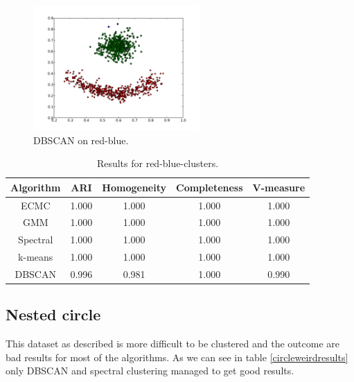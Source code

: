\documentclass[conference]{IEEEtran}
\begin{document}
\begin{figure}[th]
\centering
\includegraphics[width=15pc]{dbscan_red-blue-clusters.pdf}
\caption{DBSCAN on red-blue.}
\label{DBSCAN_redblue}
\end{figure}

\begin{table}[htbp]
\caption{Results for red-blue-clusters.}
\label{redblueresults}
\begin{center}
\setlength{\tabcolsep}{3pt}
\begin{tabular}{ |c|c|c|c|c| }
\hline
	\bf Algorithm & \bf ARI & \bf Homogeneity & \bf Completeness & \bf V-measure\\ \hline
	
	ECMC & 1.000 & 1.000 & 1.000 & 1.000 \\ \hline
	GMM & 1.000 & 1.000 & 1.000 & 1.000 \\ \hline
	Spectral & 1.000 & 1.000 & 1.000 & 1.000 \\ \hline
	k-means & 1.000 & 1.000 & 1.000 & 1.000 \\ \hline
	DBSCAN & 0.996 & 0.981 & 1.000 & 0.990 \\ \hline
\end{tabular}
\end{center}
\end{table}

\subsection{Nested circle}
This dataset as described is more difficult to be clustered and the outcome are bad results for most of
the algorithms. As we can see in table \ref{circleweirdresults} only DBSCAN and spectral clustering
managed to get good results.
\end{document}
